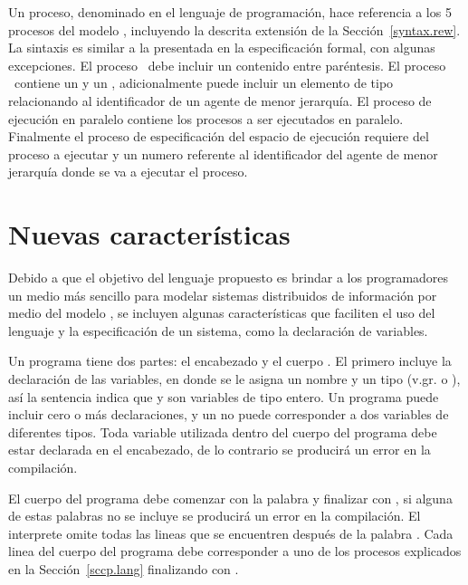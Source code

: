 Un proceso, denominado  en el lenguaje de programaci\'on, hace referencia a los 5 procesos del modelo \SCCP, incluyendo la descrita extensi\'on de la Secci\'on~\ref{syntax.rew}. La sintaxis es similar a la presentada en la especificaci\'on formal, con algunas excepciones. El proceso \tell \ debe incluir un  contenido entre par\'entesis. El proceso \ask \ contiene un  y un , adicionalmente puede incluir un elemento de tipo  relacionando al identificador de un agente de menor jerarqu\'ia. El proceso de ejecuci\'on en paralelo contiene los procesos a ser ejecutados en paralelo. Finalmente el proceso de especificaci\'on del espacio de ejecuci\'on requiere del proceso a ejecutar  y un numero referente al identificador del agente de menor jerarqu\'ia donde se va a ejecutar el proceso.

\section{Nuevas caracter\'isticas}
\label{new.lang}

Debido a que el objetivo del lenguaje propuesto es brindar a los programadores un medio m\'as sencillo para modelar sistemas distribuidos de informaci\'on por medio del modelo \SCCP, se incluyen algunas caracter\'isticas que faciliten el uso del lenguaje y la especificaci\'on de un sistema, como la declaraci\'on de variables.

Un programa  tiene dos partes: el encabezado  y el cuerpo . El primero incluye la declaraci\'on de las variables, en donde se le asigna un nombre  y un tipo (v.gr.  o ), as\'i la sentencia  indica que  y  son variables de tipo entero. Un programa puede incluir cero o m\'as declaraciones, y un  no puede corresponder a dos variables de diferentes tipos. Toda variable utilizada dentro del cuerpo del programa debe estar declarada en el encabezado, de lo contrario se producir\'a un error en la compilaci\'on.  

El cuerpo del programa debe comenzar con la palabra  y finalizar con , si alguna de estas palabras no se incluye se producir\'a un error en la compilaci\'on. El interprete omite todas las lineas que se encuentren despu\'es de la palabra . Cada linea del cuerpo del programa debe corresponder a uno de los procesos explicados en la Secci\'on~\ref{sccp.lang} finalizando con .

